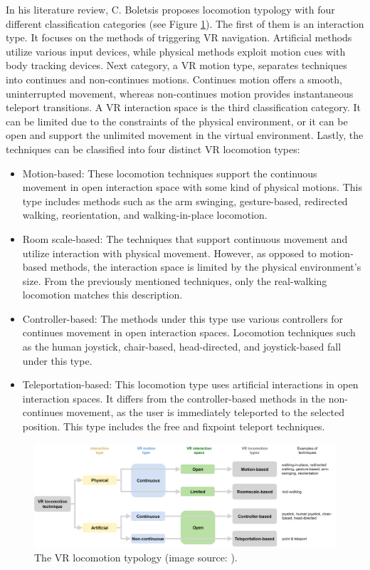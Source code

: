 In his literature review, C. Boletsis proposes locomotion typology with four different classification categories (see Figure \ref{fig:TYPOLOGY}). The first of them is an interaction type. It focuses on the methods of triggering VR navigation. Artificial methods utilize various input devices, while physical methods exploit motion cues with body tracking devices. Next category, a VR motion type, separates techniques into continues and non-continues motions. Continues motion offers a smooth, uninterrupted movement, whereas non-continues motion provides instantaneous teleport transitions. A VR interaction space is the third classification category. It can be limited due to the constraints of the physical environment, or it can be open and support the unlimited movement in the virtual environment. Lastly, the techniques can be classified into four distinct VR locomotion types:

\begin{itemize}
\item Motion-based: These locomotion techniques support the continuous movement in open interaction space with some kind of physical motions. This type includes methods such as the arm swinging, gesture-based, redirected walking, reorientation, and walking-in-place locomotion.
\item Room scale-based: The techniques that support continuous movement and utilize interaction with physical movement. However, as opposed to motion-based methods, the interaction space is limited by the physical environment's size. From the previously mentioned techniques, only the real-walking locomotion matches this description.
\item Controller-based: The methods under this type use various controllers for continues movement in open interaction spaces. Locomotion techniques such as the human joystick, chair-based, head-directed, and joystick-based fall under this type.
\item Teleportation-based: This locomotion type uses artificial interactions in open interaction spaces. It differs from the controller-based methods in the non-continues movement, as the user is immediately teleported to the selected position. This type includes the free and fixpoint teleport techniques.
\end{itemize}

\begin{figure}[th]
\centering
\includegraphics[width=1\textwidth]{img/locomotion_typology.png}
\caption{The VR locomotion typology (image source: \cite{LOCOMOTIONREVIEW}).}
\label{fig:TYPOLOGY}
\end{figure}

